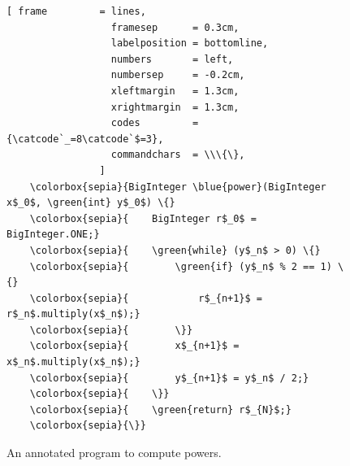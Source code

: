 \begin{figure}[!h]
\centering
\begin{Verbatim}[ frame         = lines, 
                  framesep      = 0.3cm, 
                  labelposition = bottomline,
                  numbers       = left,
                  numbersep     = -0.2cm,
                  xleftmargin   = 1.3cm,
                  xrightmargin  = 1.3cm,
                  codes         = {\catcode`_=8\catcode`$=3},
                  commandchars  = \\\{\},
                ]
    \colorbox{sepia}{BigInteger \blue{power}(BigInteger x$_0$, \green{int} y$_0$) \{}
    \colorbox{sepia}{    BigInteger r$_0$ = BigInteger.ONE;}
    \colorbox{sepia}{    \green{while} (y$_n$ > 0) \{}
    \colorbox{sepia}{        \green{if} (y$_n$ % 2 == 1) \{}
    \colorbox{sepia}{            r$_{n+1}$ = r$_n$.multiply(x$_n$);}
    \colorbox{sepia}{        \}}  
    \colorbox{sepia}{        x$_{n+1}$ = x$_n$.multiply(x$_n$);}
    \colorbox{sepia}{        y$_{n+1}$ = y$_n$ / 2;}
    \colorbox{sepia}{    \}}  
    \colorbox{sepia}{    \green{return} r$_{N}$;}
    \colorbox{sepia}{\}}  
\end{Verbatim}
\vspace*{-0.3cm}
\caption{An annotated program to compute powers.}
\label{fig:power-iterative-annotated.stlx}
\end{figure} %

